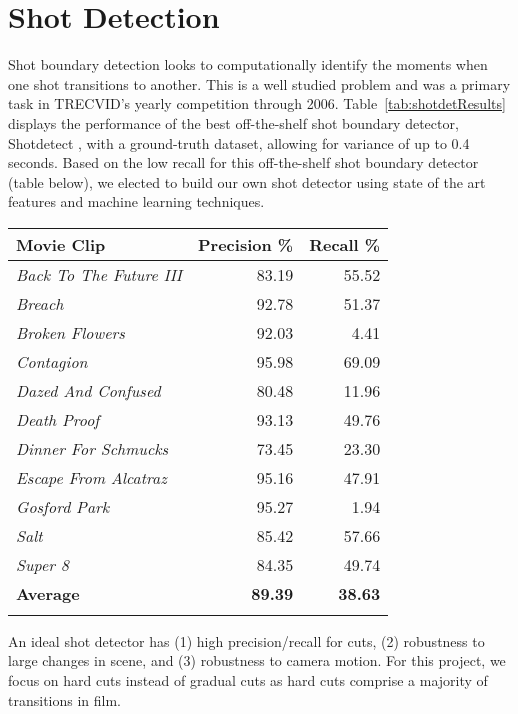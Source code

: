 \section*{Shot Detection}

Shot boundary detection looks to computationally identify the moments when one shot transitions to another. This is a well studied problem \cite{boreczky1996comparison, lienhart1998comparison, lu2013fast,chavan2014review} and was a primary task in TRECVID's yearly competition \cite{smeaton_video_2010} through 2006. Table~\ref{tab:shotdetResults} displays the performance of the best off-the-shelf shot boundary detector, Shotdetect \cite{mathe_shotdetect_2015}, with a ground-truth dataset, allowing for variance of up to 0.4 seconds. Based on the low recall for this off-the-shelf shot boundary detector (table below), we elected to build our own shot detector using state of the art features and machine learning techniques.

\begin{center}
  \small{
  \begin{tabular}{ l | r r }
    Movie Clip & Precision \% & Recall \% \\
    \hline
    \textit{ Back To The Future III } &  83.19 &  55.52\\
    \textit{ Breach } &  92.78 &  51.37\\
    \textit{ Broken Flowers } &  92.03 &  4.41\\
    \textit{ Contagion } &  95.98 &  69.09\\
    \textit{ Dazed And Confused } &  80.48 &  11.96\\
    \textit{ Death Proof } &  93.13 &  49.76\\
    \textit{ Dinner For Schmucks } &  73.45 &  23.30\\
    \textit{ Escape From Alcatraz } &  95.16 &  47.91\\
    \textit{ Gosford Park } &  95.27 &  1.94\\
    \textit{ Salt } &  85.42 &  57.66\\
    \textit{ Super 8 } &  84.35 &  49.74\\
    \textbf{ Average } &  \textbf{89.39} &  \textbf{38.63}\\
	\label{tab:shotdetResults}
  \end{tabular}}
\end{center}

An ideal shot detector has (1) high precision/recall for cuts, (2) robustness to large changes in scene, and (3) robustness to camera motion. For this project, we focus on hard cuts instead of gradual cuts as hard cuts comprise a majority of transitions in film.


